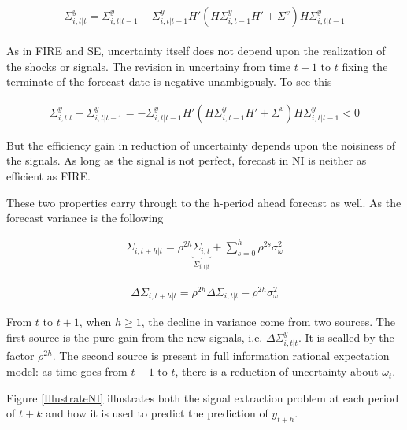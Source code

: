 \documentclass[]{article}
\begin{document}
\begin{eqnarray}
\begin{aligned}
\Sigma^y_{i,t|t} = \Sigma^y_{i,t|t-1} - \Sigma^y_{i,t|t-1} H'(H \Sigma^y_{i,t-1} H' +\Sigma^v) H \Sigma^y_{i,t|t-1} 
\end{aligned}
\end{eqnarray}


As in FIRE and SE, uncertainty itself does not depend upon the realization of the shocks or signals. The revision in uncertainy from time $t-1$ to $t$ fixing the terminate of the forecast date is negative  unambigously. To see this 

\begin{eqnarray}
\Sigma^y_{i,t|t} - \Sigma^y_{i,t|t-1} = - \Sigma^y_{i,t|t-1} H'(H \Sigma^y_{i,t-1} H' +\Sigma^v) H \Sigma^y_{i,t|t-1} <0
\end{eqnarray}

But the efficiency gain in reduction of uncertainty depends upon the noisiness of the signals. As long as the signal is not perfect, forecast in NI is neither as efficient as FIRE. 

These two properties carry through to the h-period ahead forecast as well. As the forecast variance is the following 

\begin{eqnarray}
\Sigma_{i,t+h|t} = \rho^{2h} \underbrace{\Sigma_{i,t}}_{\Sigma_{i,t|t}} + \sum^{h}_{s=0}\rho^{2s} \sigma^2_{\omega}
\end{eqnarray}


\begin{eqnarray}
\Delta \Sigma_{i,t+h|t} = \rho^{2h}\Delta  \Sigma_{i,t|t}  - \rho^{2h} \sigma^2_{\omega}
\end{eqnarray}

From $t$ to $t+1$, when $h\geq 1$, the decline in variance come from two sources. The first source is the pure gain from the new signals, i.e. $\Delta \Sigma^y_{i,t|t}$. It is scalled by the factor $\rho^{2h}$. The second source is present in full information rational expectation model: as time goes from $t-1$ to $t$, there is a reduction of uncertainty about $\omega_t$.

Figure \ref{IllustrateNI} illustrates both the signal extraction problem at each period of $t+k$ and how it is used to predict the prediction of $y_{t+h}$. 
\end{document}
